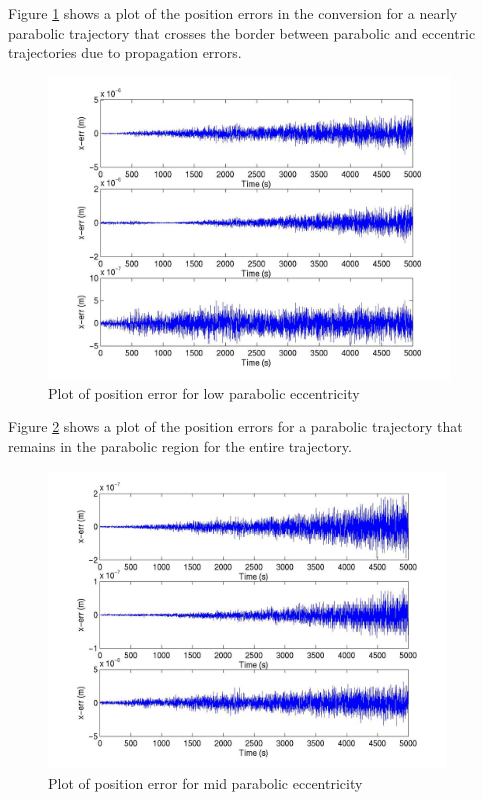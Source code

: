 \begin{description}
Figure \ref{par_low_pos} shows a plot of the position errors in the conversion
for a nearly parabolic trajectory that crosses the border between parabolic
and eccentric trajectories due to propagation errors.

\begin{figure}[h]
\begin{center}
\includegraphics[height=80mm]{JPGfiles/pos_err_par_p99.jpg}
\caption{Plot of position error for low parabolic eccentricity}
\label{par_low_pos}
\end{center}
\end{figure}

Figure \ref{par_mid_pos} shows a plot of the position errors for a parabolic
trajectory that remains in the parabolic region for the entire trajectory.

\begin{figure}[h]
\begin{center}
\includegraphics[height=79mm]{JPGfiles/pos_err_par_1.jpg}
\caption{Plot of position error for mid parabolic eccentricity}
\label{par_mid_pos}
\end{center}
\end{figure}


\end{description}
